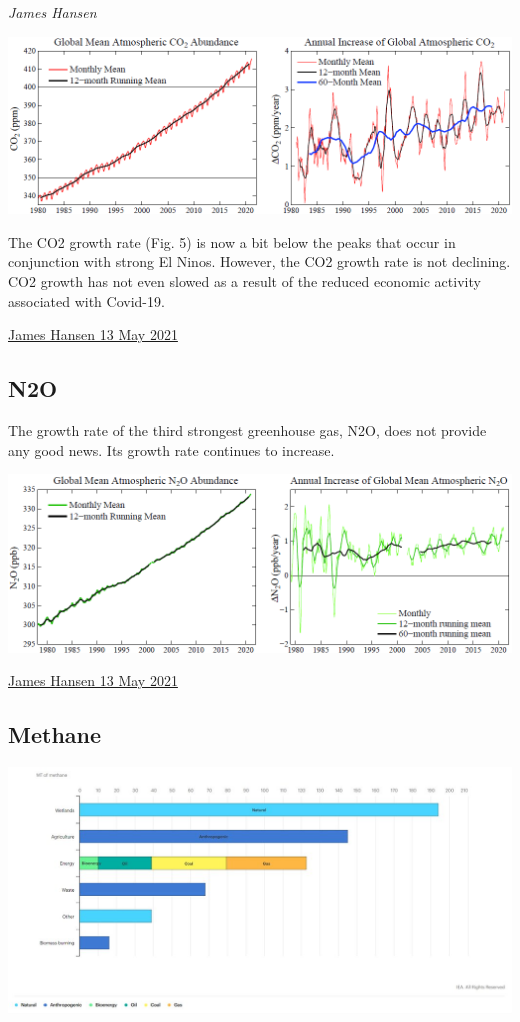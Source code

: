 \documentclass[
]{book}
\begin{document}
\emph{James Hansen}

\includegraphics{fig/CO2_Annual_Increase.png}

The CO2 growth rate (Fig. 5) is now a bit below the peaks that occur in conjunction with strong El Ninos. However, the CO2 growth rate is not declining. CO2 growth has not even slowed as a result of the reduced economic activity associated with Covid-19.

\href{https://mailchi.mp/caa/the-world-has-cooled-off-whats-the-significance}{James Hansen 13 May 2021}

\hypertarget{n2o}{%
\subsection{N2O}\label{n2o}}

The growth rate of the third strongest greenhouse gas, N2O, does not provide any good news. Its growth rate continues to increase.

\includegraphics{fig/N2O_Abundance.png}

\href{https://mailchi.mp/caa/the-world-has-cooled-off-whats-the-significance}{James Hansen 13 May 2021}

\hypertarget{methane}{%
\subsection{Methane}\label{methane}}

\includegraphics{fig/Methane_by_Source.jpeg}
\end{document}
